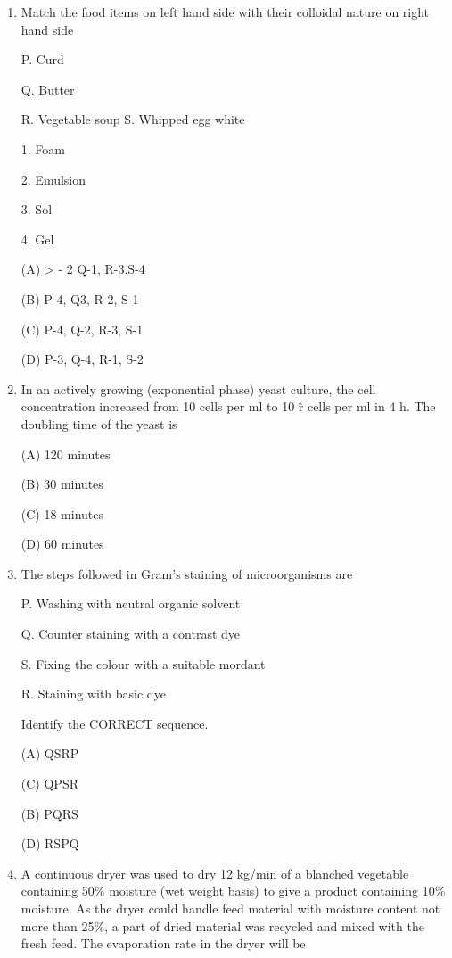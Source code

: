 \documentclass[journal]{IEEEtran}
\begin{document}
\begin{enumerate}
(B) P-2, Q-3. R-1, S-4 (D) P-4.Q-2, R-3.S-1


\item{ Match the food items on left hand side with their colloidal nature on right hand side}
\begin{minipage}{0.5\textwidth}
	\begin{flushleft}

P. Curd

Q. Butter

R. Vegetable soup
S. Whipped egg white

		\end{flushleft}
		\end{minipage}
	\begin{minipage}{0.5\textwidth}
		\begin{flushright}
1. Foam


2. Emulsion


3. Sol


4. Gel
		\end{flushright}
		\end{minipage}
(A) > - 2 Q-1, R-3.S-4

(B) P-4, Q3, R-2, S-1

(C) P-4, Q-2, R-3, S-1

(D) P-3, Q-4, R-1, S-2

\item{ In an actively growing (exponential phase) yeast culture, the cell concentration increased from 10 cells per ml to 10 \^ r cells per ml in 4 h. The doubling time of the yeast is

(A) 120 minutes

(B) 30 minutes

(C) 18 minutes

(D) 60 minutes
}
\item{ The steps followed in Gram's staining of microorganisms are

P. Washing with neutral organic solvent

Q. Counter staining with a contrast dye

S. Fixing the colour with a suitable mordant

R. Staining with basic dye

Identify the CORRECT sequence.

(A) QSRP

(C) QPSR

(B) PQRS

(D) RSPQ
}
\item{ A continuous dryer was used to dry 12 kg/min of a blanched vegetable containing 50\% moisture (wet weight basis) to give a product containing 10\% moisture. As the dryer could handle feed material with moisture content not more than 25\%, a part of dried material was recycled and mixed with the fresh feed. The evaporation rate in the dryer will be

}
\end{enumerate}
\end{document}
